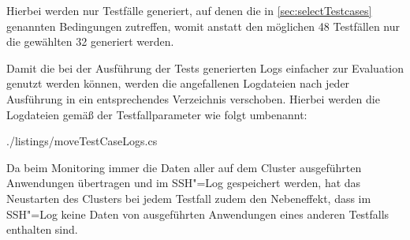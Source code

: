 Hierbei werden nur Testfälle generiert, auf denen die in \autoref{sec:selectTestcases} genannten Bedingungen zutreffen, womit anstatt den möglichen 48 Testfällen nur die gewählten 32 generiert werden.

Damit die bei der Ausführung der Tests generierten Logs einfacher zur Evaluation genutzt werden können, werden die angefallenen Logdateien nach jeder Ausführung in ein entsprechendes Verzeichnis verschoben.
Hierbei werden die Logdateien gemäß der Testfallparameter wie folgt umbenannt:


{./listings/moveTestCaseLogs.cs}

Da beim Monitoring immer die Daten aller auf dem Cluster ausgeführten Anwendungen übertragen und im SSH"=Log gespeichert werden, hat das Neustarten des Clusters bei jedem Testfall zudem den Nebeneffekt, dass im SSH"=Log keine Daten von ausgeführten Anwendungen eines anderen Testfalls enthalten sind.
